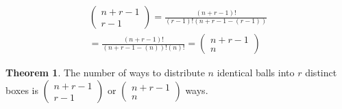 \documentclass[11pt]{article}
\theoremstyle{definition}
\newtheorem{theorem}{Theorem}[section]
\begin{document}
\begin{align*}
    \begin{pmatrix} n+r-1 \\ r-1 \end{pmatrix}
    =\frac{(n+r-1)!}{(r-1)!(n+r-1-(r-1))} \\
    =\frac{(n+r-1)!}{(n+r-1-(n))!(n)!}
    = \begin{pmatrix} n+r-1 \\ n \end{pmatrix}
\end{align*}
\begin{theorem}
    The number of ways to distribute $n$ identical balls into $r$ distinct boxes is $(\begin{smallmatrix} n+r-1 \\ r-1 \end{smallmatrix})$ or $(\begin{smallmatrix} n+r-1 \\ n \end{smallmatrix})$ ways.
\end{theorem}
\end{document}
